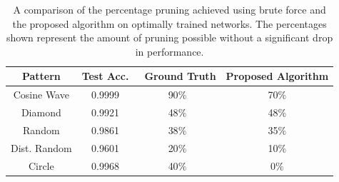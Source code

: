 \begin{table}[h!]
  \begin{center}
    \begin{tabular}{c||c||c||c}
    	Pattern & Test Acc. & \ Ground Truth & Proposed Algorithm\\
    	\hline
    	\hline
      	Cosine Wave & 0.9999 & 90$\%$ & 70$\%$\\
      	\hline
      	Diamond & 0.9921 & 48$\%$ & 48$\%$\\
      	\hline 
      	Random & 0.9861 & 38$\%$ & 35$\%$\\
      	\hline 
      	Dist. Random & 0.9601 & 20$\%$ & 10$\%$\\
      	\hline
      	Circle & 0.9968 & 40$\%$ & 0$\%$\\
    \end{tabular}
  \end{center}
  \caption{A comparison of the percentage pruning achieved using brute force and the proposed algorithm on optimally trained networks. The percentages shown represent the amount of pruning possible without a significant drop in performance.}
  \label{tab:results}
\end{table}